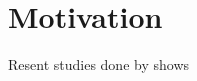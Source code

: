 \makeatletter {}\makeatother
{}
\section{Motivation}
Resent studies done by \cite{dpt907e14trending} shows 
\worksheetend